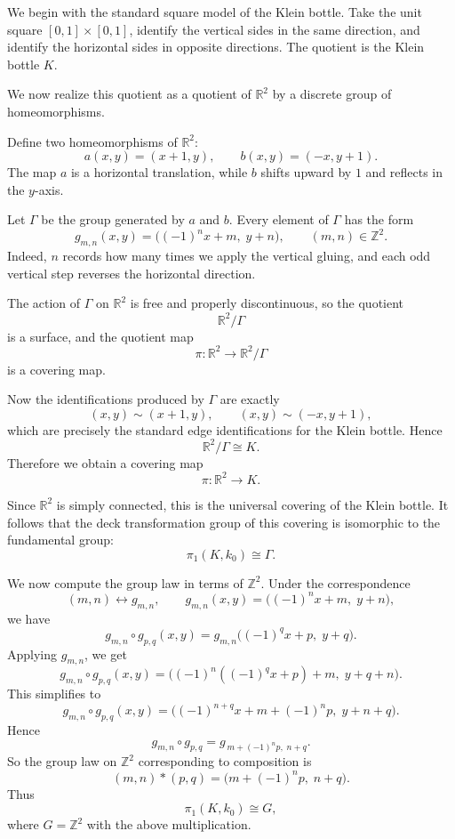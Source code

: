 \begin{solution}
We begin with the standard square model of the Klein bottle. Take the unit square \([0,1]\times[0,1]\), identify the vertical sides in the same direction, and identify the horizontal sides in opposite directions. The quotient is the Klein bottle \(K\).

We now realize this quotient as a quotient of \(\mathbb R^2\) by a discrete group of homeomorphisms.

Define two homeomorphisms of \(\mathbb R^2\):
\[
a(x,y)=(x+1,y),
\qquad
b(x,y)=(-x,y+1).
\]
The map \(a\) is a horizontal translation, while \(b\) shifts upward by \(1\) and reflects in the \(y\)-axis.

Let \(\Gamma\) be the group generated by \(a\) and \(b\). Every element of \(\Gamma\) has the form
\[
g_{m,n}(x,y)=\bigl((-1)^n x+m,\; y+n\bigr),
\qquad (m,n)\in\mathbb Z^2.
\]
Indeed, \(n\) records how many times we apply the vertical gluing, and each odd vertical step reverses the horizontal direction.

The action of \(\Gamma\) on \(\mathbb R^2\) is free and properly discontinuous, so the quotient
\[
\mathbb R^2/\Gamma
\]
is a surface, and the quotient map
\[
\pi:\mathbb R^2\to \mathbb R^2/\Gamma
\]
is a covering map.

Now the identifications produced by \(\Gamma\) are exactly
\[
(x,y)\sim(x+1,y),
\qquad
(x,y)\sim(-x,y+1),
\]
which are precisely the standard edge identifications for the Klein bottle. Hence
\[
\mathbb R^2/\Gamma \cong K.
\]
Therefore we obtain a covering map
\[
\pi:\mathbb R^2\to K.
\]

Since \(\mathbb R^2\) is simply connected, this is the universal covering of the Klein bottle. It follows that the deck transformation group of this covering is isomorphic to the fundamental group:
\[
\pi_1(K,k_0)\cong \Gamma.
\]

We now compute the group law in terms of \(\mathbb Z^2\). Under the correspondence
\[
(m,n)\longleftrightarrow g_{m,n},
\qquad
g_{m,n}(x,y)=\bigl((-1)^n x+m,\; y+n\bigr),
\]
we have
\[
g_{m,n}\circ g_{p,q}(x,y)
=
g_{m,n}\bigl((-1)^q x+p,\; y+q\bigr).
\]
Applying \(g_{m,n}\), we get
\[
g_{m,n}\circ g_{p,q}(x,y)
=
\bigl((-1)^n((-1)^q x+p)+m,\; y+q+n\bigr).
\]
This simplifies to
\[
g_{m,n}\circ g_{p,q}(x,y)
=
\bigl((-1)^{n+q}x + m + (-1)^n p,\; y+n+q\bigr).
\]
Hence
\[
g_{m,n}\circ g_{p,q}=g_{\,m+(-1)^n p,\; n+q}.
\]
So the group law on \(\mathbb Z^2\) corresponding to composition is
\[
(m,n)*(p,q)=\bigl(m+(-1)^n p,\; n+q\bigr).
\]
Thus
\[
\pi_1(K,k_0)\cong G,
\]
where \(G=\mathbb Z^2\) with the above multiplication.


\end{solution}
